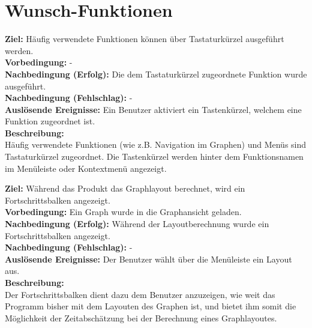 \label{fa:joanatyp}
\section{Wunsch-Funktionen}

\label{fa:hotkey}
\textbf{Ziel:} Häufig verwendete Funktionen können über Tastaturkürzel ausgeführt werden.\\
\textbf{Vorbedingung:} -\\
\textbf{Nachbedingung (Erfolg):} Die dem Tastaturkürzel zugeordnete Funktion wurde ausgeführt.\\
\textbf{Nachbedingung (Fehlschlag):} -\\
\textbf{Auslösende Ereignisse:}
Ein Benutzer aktiviert ein Tastenkürzel, welchem eine Funktion zugeordnet ist.\\
\textbf{Beschreibung:}\\
Häufig verwendete Funktionen (wie z.B. Navigation im Graphen) und Menüs sind Tastaturkürzel zugeordnet.
Die Tastenkürzel werden hinter dem Funktionsnamen im Menüleiste oder Kontextmenü angezeigt.

\label{fa:fortschritt}
\textbf{Ziel:} Während das Produkt das Graphlayout berechnet, wird ein Fortschrittsbalken angezeigt.\\
\textbf{Vorbedingung:} Ein Graph wurde in die Graphansicht geladen.\\
\textbf{Nachbedingung (Erfolg):} Während der Layoutberechnung wurde ein Fortschrittsbalken angezeigt.\\
\textbf{Nachbedingung (Fehlschlag):} -\\
\textbf{Auslösende Ereignisse:} Der Benutzer wählt über die Menüleiste ein Layout aus.\\
\textbf{Beschreibung:}\\
Der Fortschrittsbalken dient dazu dem Benutzer anzuzeigen, wie weit das Programm bisher mit dem Layouten des Graphen ist, und bietet ihm somit die Möglichkeit der Zeitabschätzung bei der Berechnung eines Graphlayoutes.

